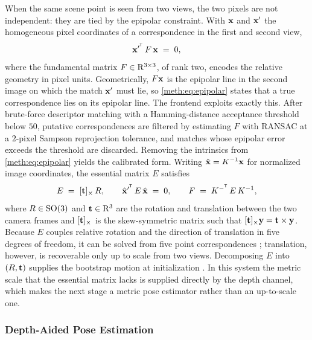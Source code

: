 When the same scene point is seen from two views, the two pixels are not independent: they are tied by the epipolar constraint. With $\mathbf{x}$ and $\mathbf{x}'$ the homogeneous pixel coordinates of a correspondence in the first and second view,
\begin{equation}
\mathbf{x}'^{^{\mathsf{T}}}\,F\,\mathbf{x} \;=\; 0,
\label{meth:eq:epipolar}
\end{equation}
where the fundamental matrix $F\in\mathrm{R}^{3\times3}$, of rank two, encodes the relative geometry in pixel units. Geometrically, $F\mathbf{x}$ is the epipolar line in the second image on which the match $\mathbf{x}'$ must lie, so \eqref{meth:eq:epipolar} states that a true correspondence lies on its epipolar line. The frontend exploits exactly this. After brute-force descriptor matching with a Hamming-distance acceptance threshold below $50$, putative correspondences are filtered by estimating $F$ with RANSAC at a $2$-pixel Sampson reprojection tolerance, and matches whose epipolar error exceeds the threshold are discarded. Removing the intrinsics from \eqref{meth:eq:epipolar} yields the calibrated form. Writing $\hat{\mathbf{x}}=K^{-1}\mathbf{x}$ for normalized image coordinates, the essential matrix $E$ satisfies
\begin{equation}
E \;=\; [\mathbf{t}]_{\times}\,R,
\qquad
\hat{\mathbf{x}}'^{^{\mathsf{T}}}\,E\,\hat{\mathbf{x}} \;=\; 0,
\qquad
F \;=\; K^{-^{\mathsf{T}}}\,E\,K^{-1},
\label{meth:eq:essential}
\end{equation}
where $R\in\mathrm{SO}(3)$ and $\mathbf{t}\in\mathrm{R}^3$ are the rotation and translation between the two camera frames and $[\mathbf{t}]_{\times}$ is the skew-symmetric matrix such that $[\mathbf{t}]_{\times}\mathbf{y}=\mathbf{t}\times\mathbf{y}$. Because $E$ couples relative rotation and the direction of translation in five degrees of freedom, it can be solved from five point correspondences \cite{nister2004fivepoint}; translation, however, is recoverable only up to scale from two views. Decomposing $E$ into $(R,\mathbf{t})$ supplies the bootstrap motion at initialization \cite{hartley2004mvg}. In this system the metric scale that the essential matrix lacks is supplied directly by the depth channel, which makes the next stage a metric pose estimator rather than an up-to-scale one.

\subsubsection{Depth-Aided Pose Estimation}

